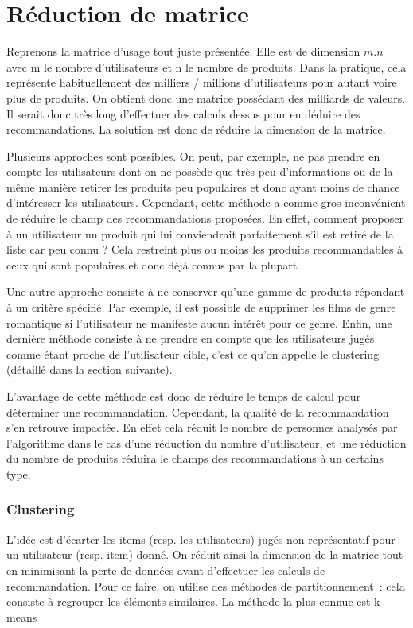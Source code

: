 \documentclass{report}
\begin{document}
\section{Réduction de matrice}
Reprenons la matrice d'usage tout juste présentée. Elle est de dimension $m.n$ avec m le nombre d'utilisateurs et n le nombre de produits. Dans la pratique, cela représente habituellement des milliers / millions d'utilisateurs pour autant voire plus de produits. On obtient donc une matrice possédant des milliards de valeurs. Il serait donc très long d'effectuer des calculs dessus pour en déduire des recommandations. La solution est donc de réduire la dimension de la matrice.\par
Plusieurs approches sont possibles. On peut, par exemple, ne pas prendre en compte les utilisateurs dont on ne possède que très peu d'informations ou de la même manière retirer les produits peu populaires et donc ayant moins de chance d'intéresser les utilisateurs. Cependant, cette méthode a comme gros inconvénient de réduire le champ des recommandations proposées. En effet, comment proposer à un utilisateur un produit qui lui conviendrait parfaitement s'il est retiré de la liste car peu connu ? Cela restreint plus ou moins les produits recommandables à ceux qui sont populaires et donc déjà connus par la plupart.\par
Une autre approche consiste à ne conserver qu'une gamme de produits répondant à un critère spécifié. Par exemple, il est possible de supprimer les films de genre romantique si l'utilisateur ne manifeste aucun intérêt pour ce genre. Enfin, une dernière méthode consiste à ne prendre en compte que les utilisateurs jugés comme étant proche de l'utilisateur cible, c'est ce qu'on appelle le clustering (détaillé dans la section suivante).\par
L'avantage de cette méthode est donc de réduire le temps de calcul pour déterminer une recommandation. Cependant, la qualité de la recommandation s'en retrouve impactée. En effet cela réduit le nombre de personnes analysés par l’algorithme dans le cas d’une réduction du nombre d’utilisateur, et une réduction du nombre de produits réduira le champs des recommandations à un certains type.
\subsubsection{Clustering}
L’idée est d’écarter les items (resp. les utilisateurs) jugés non représentatif pour un utilisateur (resp. item) donné. On réduit ainsi la dimension de la matrice tout en minimisant la perte de données avant d’effectuer les calculs de recommandation.
Pour ce faire, on utilise des méthodes de partitionnement : cela consiste à regrouper les éléments similaires. La méthode la plus connue est k-means
\end{document}
